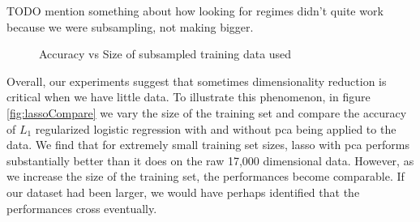 TODO mention something about how looking for regimes didn't quite work because we were subsampling, not making bigger. 
\begin{center}
\begin{figure}[!ht]
\centering
{}
\caption{Accuracy vs Size of subsampled training data used}
\label{fig:largecompareAcc}
\end{figure}
\end{center}


Overall, our experiments suggest that sometimes dimensionality reduction is critical when we have little data. To illustrate this phenomenon, in figure \ref{fig:lassoCompare} we vary the size of the training set and compare the accuracy of  $L_1$ regularized logistic regression with and without pca being applied to the data. We find that for extremely small training set sizes, lasso with pca performs substantially better than it does on the raw 17,000 dimensional data. However, as we increase the size of the training set, the performances become comparable. If our dataset had been larger, we would have perhaps identified that the performances cross eventually. 

